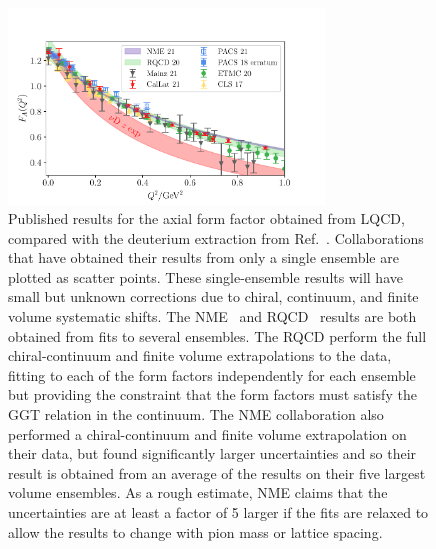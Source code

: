 \begin{figure}[hbt!]
\centering
\includegraphics[width=0.75\textwidth]{plots/gaq2-overlay-standalone.pdf}
\vspace{10pt}
\caption{
Published results for the axial form factor obtained from LQCD,
 compared with the deuterium extraction from Ref.~\cite{Meyer:2016oeg}.
Collaborations that have obtained their results from only a single ensemble
 are plotted as scatter points.
These single-ensemble results will have small but unknown corrections due to chiral, continuum,
 and finite volume systematic shifts.
The NME~\cite{Park:2021ypf} and RQCD~\cite{RQCD:2019jai}
 results are both obtained from fits to several ensembles.
The RQCD perform the full chiral-continuum and finite volume extrapolations to the data,
 fitting to each of the form factors independently for each ensemble but providing
 the constraint that the form factors must satisfy the GGT relation in the continuum.
The NME collaboration also performed a chiral-continuum and finite volume extrapolation
 on their data, but found significantly larger uncertainties and so their result
 is obtained from an average of the results on their five largest volume ensembles.
As a rough estimate, NME claims that the uncertainties are at least a factor of 5 larger
 if the fits are relaxed to allow the results to change with pion mass or lattice spacing.}
\label{fig:gaq2_overlay}
\end{figure}


